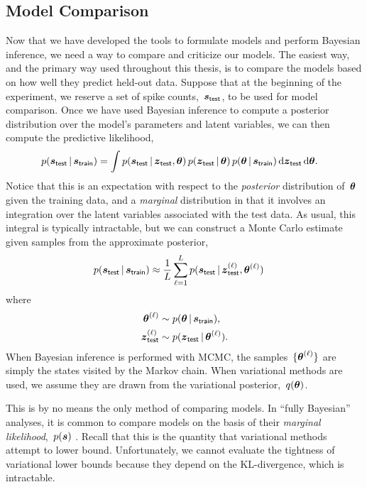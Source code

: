 \subsection{Model Comparison}
Now that we have developed the tools to formulate models and perform
Bayesian inference, we need a way to compare and criticize our models.
The easiest way, and the primary way used throughout this thesis, is
to compare the models based on how well they predict 
held-out data. Suppose that at the beginning of the experiment, we reserve
a set of spike counts,~$\boldsymbol{s}_{\mathsf{test}}$, to be used for model
comparison. Once we have used Bayesian inference to compute a
posterior distribution over the model's parameters and latent variables,
we can then compute the predictive likelihood,
\begin{align}
  \label{eq:predictive_likelihood}
  p(\boldsymbol{s}_{\mathsf{test}} \,|\, \boldsymbol{s}_{\mathsf{train}})
  &= \int p(\boldsymbol{s}_{\mathsf{test}} \,|\, \boldsymbol{z}_{\mathsf{test}}, \boldsymbol{\theta}) \,
  p(\boldsymbol{z}_{\mathsf{test}} \,|\, \boldsymbol{\theta}) \,
  p(\boldsymbol{\theta} \,|\, \boldsymbol{s}_{\mathsf{train}}) \,
  \mathrm{d}\boldsymbol{z}_{\mathsf{test}} \, \mathrm{d} \boldsymbol{\theta}.
\end{align}
Notice that this is an expectation with respect to the \emph{posterior}
distribution of~$\boldsymbol{\theta}$ given the training data, and a \emph{marginal}
distribution in that it involves an integration over the latent variables
associated with the test data. As usual, this integral is typically
intractable, but we can construct a Monte Carlo estimate given 
samples from the approximate posterior,
\begin{align*}
  p(\boldsymbol{s}_{\mathsf{test}} \,|\, \boldsymbol{s}_{\mathsf{train}})
  &\approx \frac{1}{L} \sum_{\ell=1}^L
  p(\boldsymbol{s}_{\mathsf{test}} \,|\, \boldsymbol{z}_{\mathsf{test}}^{(\ell)}, \boldsymbol{\theta}^{(\ell)}) \,
\end{align*}
where
\begin{align*}
  \boldsymbol{\theta}^{(\ell)} &\sim p(\boldsymbol{\theta} \,|\, \boldsymbol{s}_{\mathsf{train}}), \\
  \boldsymbol{z}_{\mathsf{test}}^{(\ell)} &\sim   p(\boldsymbol{z}_{\mathsf{test}} \,|\, \boldsymbol{\theta}^{(\ell)}).
\end{align*}
When Bayesian inference is performed with MCMC, the samples~$\{\boldsymbol{\theta}^{(\ell)}\}$
are simply the states visited by the Markov chain. When variational methods
are used, we assume they are drawn from the  variational posterior,~$q(\boldsymbol{\theta})$.

This is by no means the only method of comparing models. In ``fully
Bayesian'' analyses, it is common to compare models on the basis of
their \emph{marginal likelihood},~$p(\boldsymbol{s})$ \citep{kass1995bayes}. Recall that this is the
quantity that variational methods attempt to lower bound. Unfortunately,
we cannot evaluate the tightness of variational lower bounds because
they depend on the KL-divergence, which is intractable.

